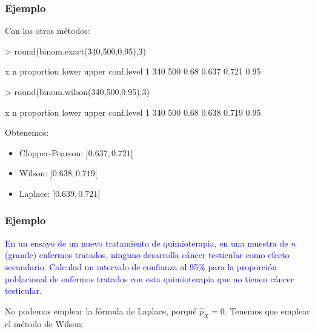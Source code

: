 \documentclass[12pt,t]{beamer}
\newcommand{\blue}[1]{\textcolor{blue}{#1}}
\theoremstyle{plain}
\theoremstyle{definition}
\begin{document}
\begin{frame}[fragile]
\frametitle{Ejemplo}

Con los otros métodos:


\begin{Schunk}
\begin{Sinput}
> round(binom.exact(340,500,0.95),3)
\end{Sinput}
\begin{Soutput}
    x   n proportion lower upper conf.level
1 340 500       0.68 0.637 0.721       0.95
\end{Soutput}
\begin{Sinput}
> round(binom.wilson(340,500,0.95),3)
\end{Sinput}
\begin{Soutput}
    x   n proportion lower upper conf.level
1 340 500       0.68 0.638 0.719       0.95
\end{Soutput}
\end{Schunk}


Obtenemos:
\medskip

\begin{itemize}
\item Clopper-Pearson: $]0.637,0.721[$
\medskip

\item Wilson: $]0.638, 0.719[$
\medskip

\item Laplace: $]0.639,0.721[$
\end{itemize}

\end{frame}

\begin{frame}
\frametitle{Ejemplo}

\blue{En un ensayo de un nuevo  tratamiento de quimioterapia, en una muestra de $n$ (grande) enfermos tratados, ninguno desarrolla cáncer testicular
como  efecto secundario. Calculad un intervalo de confianza  al 95\%  para la proporción poblacional  de enfermos tratados con esta
quimioterapia que no tienen cáncer testicular.}
\bigskip

No podemos emplear la fórmula de Laplace, porqué $\widehat{p}_X=0$. Tenemos que emplear el método de Wilson:


\end{frame}
\end{document}
